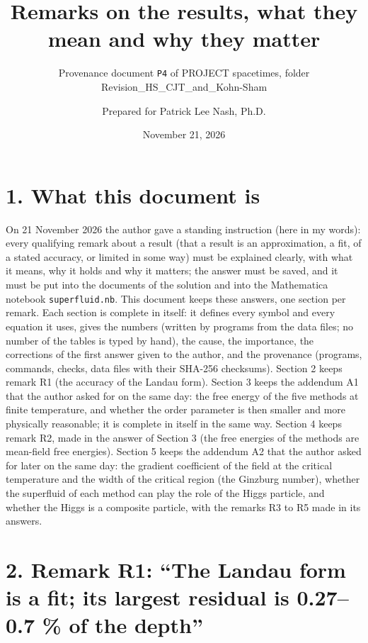 \documentclass[
  10pt,
]{article}
\title{Remarks on the results, what they mean and why they matter}
\subtitle{Provenance document \texttt{P4} of PROJECT spacetimes, folder
Revision\_HS\_CJT\_and\_Kohn-Sham}
\author{Prepared for Patrick Lee Nash, Ph.D.}
\date{November 21, 2026}
\begin{document}
\maketitle

\hypertarget{what-this-document-is}{%
\section{1. What this document is}\label{what-this-document-is}}

On 21 November 2026 the author gave a standing instruction (here in my
words): every qualifying remark about a result (that a result is an
approximation, a fit, of a stated accuracy, or limited in some way) must
be explained clearly, with what it means, why it holds and why it
matters; the answer must be saved, and it must be put into the documents
of the solution and into the Mathematica notebook
\texttt{superfluid.nb}. This document keeps these answers, one section
per remark. Each section is complete in itself: it defines every symbol
and every equation it uses, gives the numbers (written by programs from
the data files; no number of the tables is typed by hand), the cause,
the importance, the corrections of the first answer given to the author,
and the provenance (programs, commands, checks, data files with their
SHA-256 checksums). Section 2 keeps remark R1 (the accuracy of the
Landau form). Section 3 keeps the addendum A1 that the author asked for
on the same day: the free energy of the five methods at finite
temperature, and whether the order parameter is then smaller and more
physically reasonable; it is complete in itself in the same way. Section
4 keeps remark R2, made in the answer of Section 3 (the free energies of
the methods are mean-field free energies). Section 5 keeps the addendum
A2 that the author asked for later on the same day: the gradient
coefficient of the field at the critical temperature and the width of
the critical region (the Ginzburg number), whether the superfluid of
each method can play the role of the Higgs particle, and whether the
Higgs is a composite particle, with the remarks R3 to R5 made in its
answers.

\hypertarget{remark-r1-the-landau-form-is-a-fit-its-largest-residual-is-0.270.7-of-the-depth}{%
\section{2. Remark R1: ``The Landau form is a fit; its largest residual
is 0.27--0.7 \% of the
depth''}\label{remark-r1-the-landau-form-is-a-fit-its-largest-residual-is-0.270.7-of-the-depth}}
\end{document}
